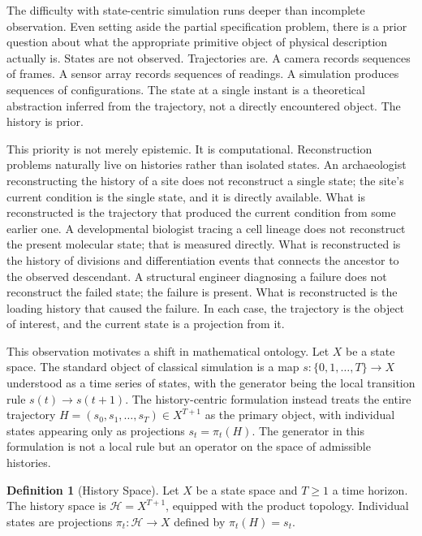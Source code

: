 \documentclass[12pt,oneside]{article}
\theoremstyle{definition}
\newtheorem{definition}[theorem]{Definition}
\newcommand{\H}{\mathcal{H}}
\begin{document}
The difficulty with state-centric simulation runs deeper than incomplete observation.
Even setting aside the partial specification problem, there is a prior question about what
the appropriate primitive object of physical description actually is. States are not
observed. Trajectories are. A camera records sequences of frames. A sensor array records
sequences of readings. A simulation produces sequences of configurations. The state at a
single instant is a theoretical abstraction inferred from the trajectory, not a directly
encountered object. The history is prior.

This priority is not merely epistemic. It is computational. Reconstruction problems
naturally live on histories rather than isolated states. An archaeologist reconstructing
the history of a site does not reconstruct a single state; the site's current condition
is the single state, and it is directly available. What is reconstructed is the trajectory
that produced the current condition from some earlier one. A developmental biologist
tracing a cell lineage does not reconstruct the present molecular state; that is measured
directly. What is reconstructed is the history of divisions and differentiation events
that connects the ancestor to the observed descendant. A structural engineer diagnosing a
failure does not reconstruct the failed state; the failure is present. What is reconstructed
is the loading history that caused the failure. In each case, the trajectory is the object
of interest, and the current state is a projection from it.

This observation motivates a shift in mathematical ontology. Let \(X\) be a state space.
The standard object of classical simulation is a map \(s : \{0, 1, \ldots, T\} \to X\)
understood as a time series of states, with the generator being the local transition rule
\(s(t) \to s(t+1)\). The history-centric formulation instead treats the entire trajectory
\(H = (s_0, s_1, \ldots, s_T) \in X^{T+1}\) as the primary object, with individual
states appearing only as projections \(s_t = \pi_t(H)\). The generator in this formulation
is not a local rule but an operator on the space of admissible histories.

\begin{definition}[History Space]
Let \(X\) be a state space and \(T \geq 1\) a time horizon. The history space is
\(\H = X^{T+1}\), equipped with the product topology. Individual states are projections
\(\pi_t : \H \to X\) defined by \(\pi_t(H) = s_t\).
\end{definition}
\end{document}
